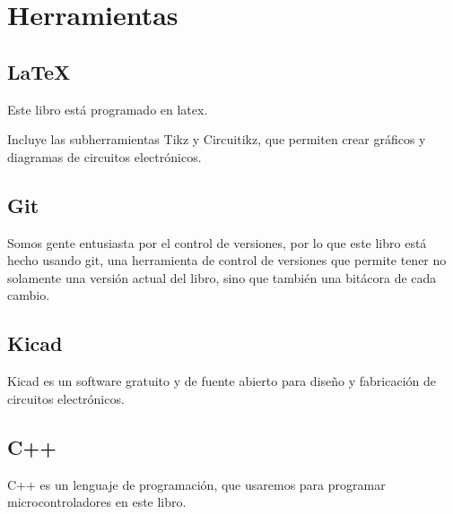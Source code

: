 \documentclass[../principal.tex]{subfiles}
\begin{document}

\chapter{Herramientas}

\section{LaTeX}

Este libro está programado en \gls{latex}.

Incluye las subherramientas Tikz y Circuitikz, que permiten crear gráficos y diagramas de circuitos electrónicos.

\section{Git}

Somos gente entusiasta por el control de versiones, por lo que este libro está hecho usando \gls{git}, una herramienta de control de versiones que permite tener no solamente una versión actual del libro, sino que también una bitácora de cada cambio.

\section{Kicad}

Kicad es un software gratuito y de fuente abierto para diseño y fabricación de circuitos electrónicos.

\section{C++}

C++ es un lenguaje de programación, que usaremos para programar microcontroladores en este libro.

\newpage
\end{document}
